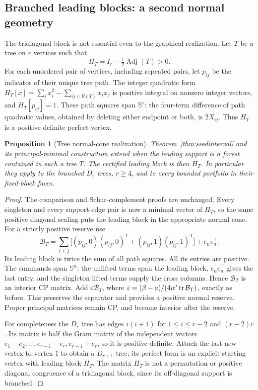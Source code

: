 \documentclass[11pt]{article}
\newtheorem{proposition}[theorem]{Proposition}
\theoremstyle{definition}\newtheorem{definition}[theorem]{Definition}
\theoremstyle{remark}\newtheorem{remark}[theorem]{Remark}
\newcommand{\T}{^{\mathsf T}}\newcommand{\norm}[1]{\lVert #1\rVert}
\begin{document}
\subsection{Branched leading blocks: a second normal geometry}
The tridiagonal block is not essential even to the graphical realization. Let $T$ be a tree on $r$ vertices such that
\[
 H_T=I_r-\tfrac12\operatorname{Adj}(T)>0.
\]
For each unordered pair of vertices, including repeated pairs, let $p_{ij}$ be the indicator of their unique tree path. The integer quadratic form $H_T[x]=\sum_i x_i^2-\sum_{ij\in E(T)}x_ix_j$ is positive integral on nonzero integer vectors, and $H_T[p_{ij}]=1$. These path squares span $\mathbb S^r$: the four-term difference of path quadratic values, obtained by deleting either endpoint or both, is $2X_{ij}$. Thus $H_T$ is a positive definite perfect vertex.

\begin{proposition}[Tree normal-cone realization]\label{prop:tree}
Theorem~\ref{thm:seedinterval} and its principal-minimal construction extend when the leading support is a forest contained in such a tree $T$. The certified leading block is then $H_T$. In particular they apply to the branched $D_r$ trees, $r\ge4$, and to every bounded portfolio in their fixed-block faces.
\end{proposition}
\begin{proof}
The comparison and Schur-complement proofs are unchanged. Every singleton and every support-edge pair is now a minimal vector of $H_T$, so the same positive diagonal scaling puts the leading block in the appropriate normal cone. For a strictly positive reserve use
\[
 \mathcal B_T=
 \sum_{i\le j}\bigl[(p_{ij},0)(p_{ij},0)\T+
                       (p_{ij},1)(p_{ij},1)\T\bigr]+e_ne_n\T.
\]
Its leading block is twice the sum of all path squares. All its entries are positive. The summands span $\mathbb S^n$: the unlifted terms span the leading block, $e_ne_n\T$ gives the last entry, and the singleton lifted terms supply the cross columns. Hence $\mathcal B_T$ is an interior CP matrix. Add $\varepsilon\mathcal B_T$, where $\varepsilon=(\beta-a)/(4w'\operatorname{tr}\mathcal B_T)$, exactly as before. This preserves the separator and provides a positive normal reserve. Proper principal matrices remain CP, and become interior after the reserve.

For completeness the $D_r$ tree has edges $i(i+1)$ for $1\le i\le r-2$ and $(r-2)r$. Its matrix is half the Gram matrix of the independent vectors
$e_1-e_2,\ldots,e_{r-1}-e_r,e_{r-1}+e_r$, so it is positive definite. Attach the last new vertex to vertex $1$ to obtain a $D_{r+1}$ tree; its perfect form is an explicit starting vertex with leading block $H_T$. The matrix $H_T$ is not a permutation or positive diagonal congruence of a tridiagonal block, since its off-diagonal support is branched.
\end{proof}
\end{document}
